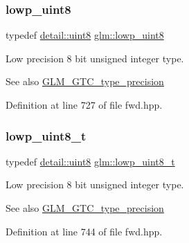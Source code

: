 \subsubsection{\texorpdfstring{lowp\+\_\+uint8}{lowp\_uint8}}
{\footnotesize\ttfamily typedef \hyperlink{namespaceglm_1_1detail_aef2588f97d090cc19fbbe0c74fe17c8f}{detail\+::uint8} \hyperlink{group__gtc__type__precision_ga4d9dc08b7b248a386dfe9afd00fc6b1e}{glm\+::lowp\+\_\+uint8}}

Low precision 8 bit unsigned integer type. \begin{DoxySeeAlso}{See also}
\hyperlink{group__gtc__type__precision}{G\+L\+M\+\_\+\+G\+T\+C\+\_\+type\+\_\+precision} 
\end{DoxySeeAlso}


Definition at line 727 of file fwd.\+hpp.

\mbox{\label{group__gtc__type__precision_ga0910ef24195d1b8b26e34d73148c0c45}} 
\subsubsection{\texorpdfstring{lowp\+\_\+uint8\+\_\+t}{lowp\_uint8\_t}}
{\footnotesize\ttfamily typedef \hyperlink{namespaceglm_1_1detail_aef2588f97d090cc19fbbe0c74fe17c8f}{detail\+::uint8} \hyperlink{group__gtc__type__precision_ga0910ef24195d1b8b26e34d73148c0c45}{glm\+::lowp\+\_\+uint8\+\_\+t}}

Low precision 8 bit unsigned integer type. \begin{DoxySeeAlso}{See also}
\hyperlink{group__gtc__type__precision}{G\+L\+M\+\_\+\+G\+T\+C\+\_\+type\+\_\+precision} 
\end{DoxySeeAlso}


Definition at line 744 of file fwd.\+hpp.

\mbox{\label{group__gtc__type__precision_gae48c64f920be353ece773ff367f0161c}} 
